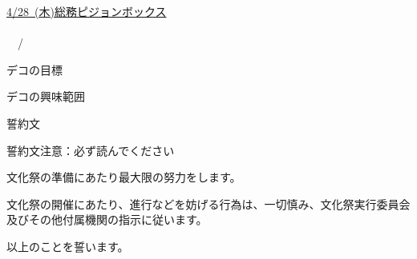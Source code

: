 \documentclass[paper=b4j, landscape, fleqn, jafontsize=9pt, jafontscale=1, head_space=25.5mm, foot_space=15mm, fore-edge=14.5mm, gutter=14.5mm, hanging_punctuation, baselineskip=7mm]{jlreq}
\begin{document}
\begin{answersheet}
\begin{center}
    {\selectsize{15pt}{15pt}}
    \vskip5mm
\end{center}
\uline{{\selectsize{10pt}{10pt}\uline{4/28~({\selectsize{9pt}{9pt}木})}}}\uline{総務ピジョンボックス}\\
\uline{\hspace{70mm}}\uline{\hspace{50mm}} \\
\uline{\hspace{55mm}}~~/~~\uline{\hspace{55mm}} \\

\begin{question}{デコの目標}
\end{question}
\vskip-4mm
\noindent\writebox[height=150mm]{}
\vskip10mm

\begin{question}{デコの興味範囲}
\end{question}
\vskip-4mm
\noindent\writebox[height=100mm]{}
\vskip10mm

\begin{question}{誓約文}
    \vskip-10mm
    \begin{framebox-brackets}{誓約文}{注意：必ず読んでください}
        \begin{reitemize}
            \item 文化祭の準備にあたり最大限の努力をします。
            \item 文化祭の開催にあたり、進行などを妨げる行為は、一切慎み、文化祭実行委員会及びその他付属機関の指示に従います。
        \end{reitemize}
        以上のことを誓います。
    \end{framebox-brackets}
\end{question}

\end{answersheet}
\end{document}
